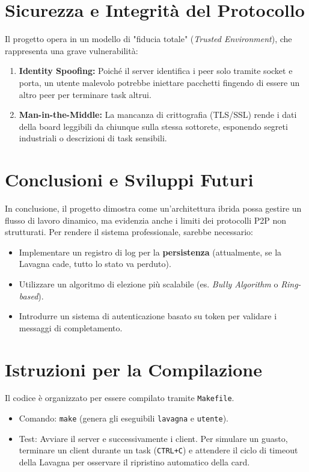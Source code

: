 \documentclass[a4paper,11pt]{article}
\begin{document}
\section{Sicurezza e Integrità del Protocollo}
Il progetto opera in un modello di "fiducia totale" (\textit{Trusted Environment}), che rappresenta una grave vulnerabilità:
\begin{enumerate}
    \item \textbf{Identity Spoofing:} Poiché il server identifica i peer solo tramite socket e porta, un utente malevolo potrebbe iniettare pacchetti fingendo di essere un altro peer per terminare task altrui.
    \item \textbf{Man-in-the-Middle:} La mancanza di crittografia (TLS/SSL) rende i dati della board leggibili da chiunque sulla stessa sottorete, esponendo segreti industriali o descrizioni di task sensibili.
\end{enumerate}

\section{Conclusioni e Sviluppi Futuri}
In conclusione, il progetto dimostra come un'architettura ibrida possa gestire un flusso di lavoro dinamico, ma evidenzia anche i limiti dei protocolli P2P non strutturati. Per rendere il sistema professionale, sarebbe necessario:
\begin{itemize}
    \item Implementare un registro di log per la \textbf{persistenza} (attualmente, se la Lavagna cade, tutto lo stato va perduto).
    \item Utilizzare un algoritmo di elezione più scalabile (es. \textit{Bully Algorithm} o \textit{Ring-based}).
    \item Introdurre un sistema di autenticazione basato su token per validare i messaggi di completamento.
\end{itemize}

\section{Istruzioni per la Compilazione}
Il codice è organizzato per essere compilato tramite \texttt{Makefile}. 
\begin{itemize}
    \item Comando: \texttt{make} (genera gli eseguibili \texttt{lavagna} e \texttt{utente}).
    \item Test: Avviare il server e successivamente i client. Per simulare un guasto, terminare un client durante un task (\texttt{CTRL+C}) e attendere il ciclo di timeout della Lavagna per osservare il ripristino automatico della card.
\end{itemize}
\end{document}
